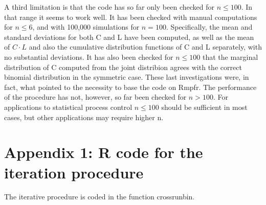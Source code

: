 A third limitation is that the code has so far only been checked for $n \leq 100$. In that range it seems to work well. It has been checked with manual computations for $n \leq 6$, and with 100,000 simulations for $n=100$. Specifically, the mean and standard deviations for both C and L have been computed, as well as the mean of $C \cdot L$ and also the cumulative distribution functions of C and L separately, with no substantial deviations. It has also been checked for $n \leq 100$ that the marginal distribution of C computed from the joint distribion agrees with the correct binomial distribution in the symmetric case. These last investigations were, in fact, what pointed to the necessity to base the code on Rmpfr. The performance of the procedure has not, however, so far been checked for $n>100$. For applications to statistical process control $n \leq 100$ should be sufficient in most cases, but other applications may require higher n.

\section{Appendix 1: R code for the iteration procedure}

The iterative procedure is coded in the function crossrunbin. 

